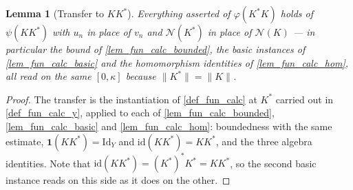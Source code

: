 \documentclass[a4paper]{report}
\theoremstyle{plain}
\newtheorem{lemma}[theorem]{Lemma}
\theoremstyle{definition}
\theoremstyle{remark}
\begin{document}
\begin{lemma}[Transfer to $KK^*$]
  \label{lem_fun_calc_y}
  Everything asserted of $\varphi(K^*K)$ holds of $\psi(KK^*)$ with $u_n$ in place of
  $v_n$ and $\mathcal{N}(K^*)$ in place of $\mathcal{N}(K)$ --- in particular the bound of
  \cref{lem_fun_calc_bounded}, the basic instances of \cref{lem_fun_calc_basic} and the
  homomorphism identities of \cref{lem_fun_calc_hom}, all read on the same $[0,\kappa]$
  because $\|K^*\| = \|K\|$.
\end{lemma}
\begin{proof}
  The transfer is the instantiation of \cref{def_fun_calc} at $K^*$ carried out in
  \cref{def_fun_calc_y}, applied to each of \cref{lem_fun_calc_bounded},
  \cref{lem_fun_calc_basic} and \cref{lem_fun_calc_hom}: boundedness with the same
  estimate, $\mathbf{1}(KK^*) = \mathrm{Id}_Y$ and $\mathrm{id}(KK^*) = KK^*$, and the
  three algebra identities.  Note that $\mathrm{id}(KK^*) = (K^*)^*K^* = KK^*$, so the
  second basic instance reads on this side as it does on the other.
\end{proof}
\end{document}
